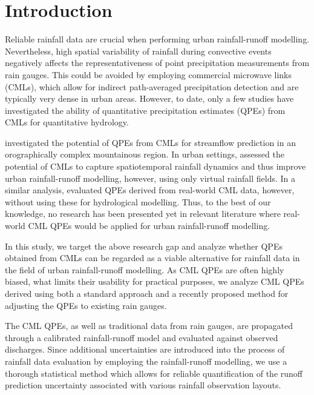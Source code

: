 \documentclass{ctuthesis}\usepackage[]{graphicx}\usepackage[]{color}
\begin{document}
\section{Introduction}

Reliable rainfall data are crucial when performing urban rainfall-runoff modelling. Nevertheless, high spatial variability of rainfall during convective events negatively affects the representativeness of point precipitation measurements from rain gauges. This could be avoided by employing commercial microwave links (CMLs), which allow for indirect path-averaged precipitation detection and are typically very dense in urban areas. However, to date, only a few studies have investigated the ability of quantitative precipitation estimates (QPEs) from CMLs for quantitative hydrology. 

\cite{smiatekPotentialCommercialMicrowave2017} investigated the potential of QPEs from CMLs for streamflow prediction in an orographically complex mountainous region. In urban settings,  \cite{fencl2013assessing} assessed the potential of CMLs to capture spatiotemporal rainfall dynamics and thus improve urban rainfall-runoff modelling, however, using only  virtual rainfall fields. In a similar analysis, \cite{fenclCommercialMicrowaveLinks2015} evaluated QPEs derived from real-world CML data, however, without using these for hydrological modelling. Thus, to the best of our knowledge, no research has been presented yet in relevant literature where real-world CML QPEs would be applied for urban rainfall-runoff modelling. 

In this study, we target the above research gap and analyze whether QPEs obtained from CMLs can be regarded as a viable alternative for rainfall data in the field of urban rainfall-runoff modelling. As CML QPEs are often highly biased, what limits their usability for practical purposes, we analyze CML QPEs derived using both a standard approach and a recently proposed \citep{fenclGaugeadjustedRainfallEstimates2017} method for adjusting the QPEs to existing rain gauges. 

The CML QPEs, as well as traditional data from rain gauges, are propagated through a calibrated rainfall-runoff model and evaluated against observed discharges. Since additional uncertainties are introduced into the process of rainfall data evaluation by employing the rainfall-runoff modelling, we use a thorough statistical method which allows for reliable quantification of the runoff prediction uncertainty associated with various rainfall observation layouts. 
\end{document}
